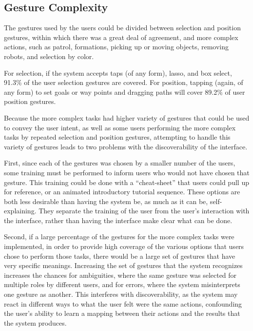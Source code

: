\subsection{Gesture Complexity}

The gestures used by the users could be divided between selection and position gestures, within which there was a great deal of agreement, and more complex actions, such as patrol, formations, picking up or moving objects, removing robots, and selection by color. 

For selection, if the system accepts taps (of any form), lasso, and box select, 91.3\% of the user selection gestures are covered. For position, tapping (again, of any form) to set goals or way points and dragging paths will cover 89.2\% of user position gestures.

Because the more complex tasks had higher variety of gestures that could be used to convey the user intent, as well as some users performing the more complex tasks by repeated selection and position gestures, attempting to handle this variety of gestures leads to two problems with the discoverability of the interface. 

First, since each of the gestures was chosen by a smaller number of the users, some training must be performed to inform users who would not have chosen that gesture. 
This training could be done with a ``cheat-sheet'' that users could pull up for reference, or an animated introductory tutorial sequence. 
These options are both less desirable than having the system be, as much as it can be, self-explaining. 
They separate the training of the user from the user's interaction with the interface, rather than having the interface make clear what can be done.

Second, if a large percentage of the gestures for the more complex tasks were implemented, in order to provide high coverage of the various options that users chose to perform those tasks, there would be a large set of gestures that have very specific meanings. 
Increasing the set of gestures that the system recognizes increases the chances for ambiguities, where the same gesture was selected for multiple roles by different users, and for errors, where the system misinterprets one gesture as another. 
This interferes with discoverability, as the system may react in different ways to what the user felt were the same actions, confounding the user's ability to learn a mapping between their actions and the results that the system produces. 

